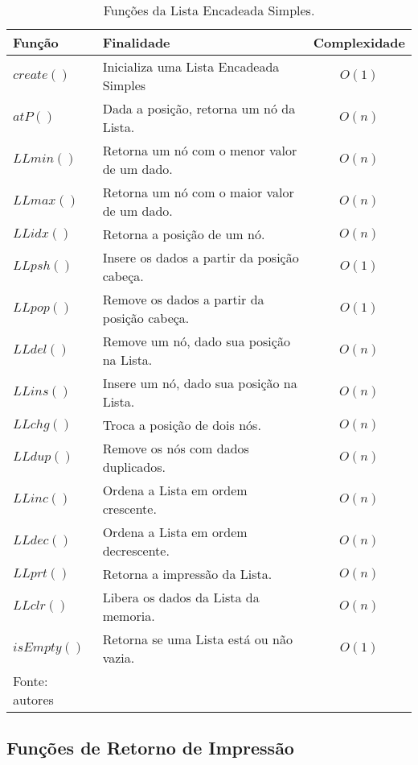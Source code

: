 \documentclass[12pt,a4paper]{article}
\begin{document}
\begin{table}[H]
	\renewcommand{\arraystretch}{1}
	\centering
	\caption{Funções da Lista Encadeada Simples.}
	\label{tab:linkedlist}
	\begin{tabular}{p{2.7cm} p{9.5cm} c}
		\toprule 
		Função & Finalidade & Complexidade \\ 
		\midrule
		$create()$ & Inicializa uma Lista Encadeada Simples & $O(1)$ \\
		$atP()$ & Dada a posição, retorna um nó da Lista. & $O(n)$ \\
		$LLmin()$ & Retorna um nó com o menor valor de um dado. & $O(n)$ \\
		$LLmax()$ & Retorna um nó com o maior valor de um dado. & $O(n)$ \\
		$LLidx()$ & Retorna a posição de um nó. & $O(n)$ \\
		$LLpsh()$ & Insere os dados a partir da posição cabeça. & $O(1)$ \\
		$LLpop()$ & Remove os dados a partir da posição cabeça. & $O(1)$ \\
		$LLdel()$ & Remove um nó, dado sua posição na Lista. & $O(n)$ \\
		$LLins()$ & Insere um nó, dado sua posição na Lista. & $O(n)$ \\
		$LLchg()$ & Troca a posição de dois nós. & $O(n)$ \\
		$LLdup()$ & Remove os nós com dados duplicados. & $O(n)$ \\
		$LLinc()$ & Ordena a Lista em ordem crescente. & $O(n)$ \\
		$LLdec()$ & Ordena a Lista em ordem decrescente. & $O(n)$ \\
		$LLprt()$ & Retorna a impressão da Lista. & $O(n)$ \\
		$LLclr()$ & Libera os dados da Lista da memoria. & $O(n)$ \\
		$isEmpty()$ & Retorna se uma Lista está ou não vazia. & $O(1)$ \\
		\bottomrule
		\footnotesize Fonte: autores
	\end{tabular}
\end{table}

\subsection{Funções de Retorno de Impressão}
\end{document}
